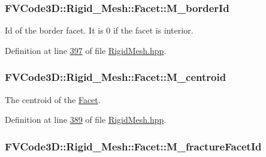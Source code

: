 \subsubsection[{\texorpdfstring{M\+\_\+border\+Id}{M_borderId}}]{ F\+V\+Code3\+D\+::\+Rigid\+\_\+\+Mesh\+::\+Facet\+::\+M\+\_\+border\+Id\hspace{0.3cm}{\ttfamily [protected]}}\hypertarget{classFVCode3D_1_1Rigid__Mesh_1_1Facet_a9e19b99a99bab61888ff73cac17de747}{}\label{classFVCode3D_1_1Rigid__Mesh_1_1Facet_a9e19b99a99bab61888ff73cac17de747}


Id of the border facet. It is 0 if the facet is interior. 



Definition at line \hyperlink{RigidMesh_8hpp_source_l00397}{397} of file \hyperlink{RigidMesh_8hpp_source}{Rigid\+Mesh.\+hpp}.

\subsubsection[{\texorpdfstring{M\+\_\+centroid}{M_centroid}}]{ F\+V\+Code3\+D\+::\+Rigid\+\_\+\+Mesh\+::\+Facet\+::\+M\+\_\+centroid\hspace{0.3cm}{\ttfamily [protected]}}\hypertarget{classFVCode3D_1_1Rigid__Mesh_1_1Facet_a59362b500ff0b33abe8b2bc2ea678916}{}\label{classFVCode3D_1_1Rigid__Mesh_1_1Facet_a59362b500ff0b33abe8b2bc2ea678916}


The centroid of the \hyperlink{classFVCode3D_1_1Rigid__Mesh_1_1Facet}{Facet}. 



Definition at line \hyperlink{RigidMesh_8hpp_source_l00389}{389} of file \hyperlink{RigidMesh_8hpp_source}{Rigid\+Mesh.\+hpp}.

\subsubsection[{\texorpdfstring{M\+\_\+fracture\+Facet\+Id}{M_fractureFacetId}}]{ F\+V\+Code3\+D\+::\+Rigid\+\_\+\+Mesh\+::\+Facet\+::\+M\+\_\+fracture\+Facet\+Id\hspace{0.3cm}{\ttfamily [protected]}}\hypertarget{classFVCode3D_1_1Rigid__Mesh_1_1Facet_ae787539c2e6ca9cd957fc1049eae764f}{}\label{classFVCode3D_1_1Rigid__Mesh_1_1Facet_ae787539c2e6ca9cd957fc1049eae764f}



